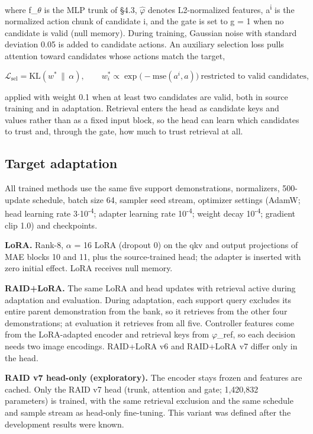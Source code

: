 \documentclass[11pt,a4paper]{article}
\begin{document}
where f\_\ensuremath{\theta} is the MLP trunk of \S{}4.3, \ensuremath{\hat{\varphi}} denotes L2-normalized features, a\textsuperscript{i} is the normalized action chunk of candidate i, and the gate is set to g = 1 when no candidate is valid (null memory). During training, Gaussian noise with standard deviation 0.05 is added to candidate actions. An auxiliary selection loss pulls attention toward candidates whose actions match the target,

\[
\mathcal{L}_{\mathrm{sel}} = \mathrm{KL}(w^\ast\,\|\,\alpha),\qquad w^\ast_i\propto\exp\bigl(-\mathrm{mse}(a^i,a)\bigr)\ \text{restricted to valid candidates},
\]

applied with weight 0.1 when at least two candidates are valid, both in source training and in adaptation. Retrieval enters the head as candidate keys and values rather than as a fixed input block, so the head can learn which candidates to trust and, through the gate, how much to trust retrieval at all.

\subsection{Target adaptation}

All trained methods use the same five support demonstrations, normalizers, 500-update schedule, batch size 64, sampler seed stream, optimizer settings (AdamW; head learning rate 3\ensuremath{\cdot}10\textsuperscript{-4}; adapter learning rate 10\textsuperscript{-4}; weight decay 10\textsuperscript{-4}; gradient clip 1.0) and checkpoints.

\textbf{LoRA.} Rank-8, \ensuremath{\alpha} = 16 LoRA (dropout 0) on the qkv and output projections of MAE blocks 10 and 11, plus the source-trained head; the adapter is inserted with zero initial effect. LoRA receives null memory.

\textbf{RAID+LoRA.} The same LoRA and head updates with retrieval active during adaptation and evaluation. During adaptation, each support query excludes its entire parent demonstration from the bank, so it retrieves from the other four demonstrations; at evaluation it retrieves from all five. Controller features come from the LoRA-adapted encoder and retrieval keys from \ensuremath{\varphi}\_ref, so each decision needs two image encodings. RAID+LoRA v6 and RAID+LoRA v7 differ only in the head.

\textbf{RAID v7 head-only (exploratory).} The encoder stays frozen and features are cached. Only the RAID v7 head (trunk, attention and gate; 1,420,832 parameters) is trained, with the same retrieval exclusion and the same schedule and sample stream as head-only fine-tuning. This variant was defined after the development results were known.
\end{document}

